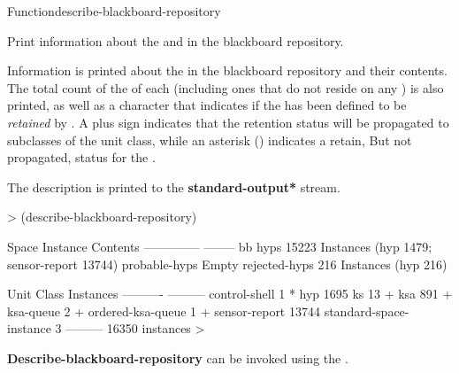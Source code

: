 \documentclass[10pt,twoside,english,pdftex]{article}
\begin{document}
\begin{functiondoc}{Function}{describe-blackboard-repository}{\noargs}

\fnsyntax

\fnpurpose {}%
%
%
Print information about the  and  in the
blackboard repository.

\fnpackage {}

\fnmodule {}

\fndescription
{}%
%
Information is printed about the  in the blackboard
repository and their contents.  The total count of the
 of each  (including ones that
do not reside on any ) is also printed, as well
as a character that indicates if the  has been
defined to be \textit{retained} by
.  A plus sign
indicates that the retention status will be propagated to subclasses
of the unit class, while an asterisk (\code{*}) indicates a retain,
But not propagated, status for the .

The description is printed to the {\bf *standard-output*} stream.

\fnexample
%
\W\supp
\begin{example}
  > (describe-blackboard-repository)

  Space Instance              Contents
  --------------              --------
  bb                            
     hyps                     15223 Instances (hyp 1479; sensor-report 13744)
     probable-hyps            Empty
     rejected-hyps            216 Instances (hyp 216)

  Unit Class                  Instances
  ----------                  ---------
  control-shell                       1 *
  hyp                              1695
  ks                                 13 + 
  ksa                               891 +
  ksa-queue                           2 +
  ordered-ksa-queue                   1 +
  sensor-report                   13744
  standard-space-instance             3
                              ---------
                                  16350 instances
>
\end{example}

\fnnote 
%
%
%
\textbf{Describe-blackboard-repository} can be invoked using the
 .

\end{functiondoc}
\end{document}
